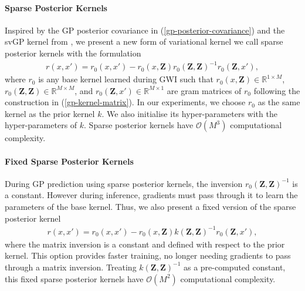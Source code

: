 \documentclass{article}
\numberwithin{equation}{section}
\begin{document}
\paragraph{Sparse Posterior Kernels}
Inspired by the GP posterior covariance in (\ref{gp-posterior-covariance}) and the svGP kernel from \cite{titsias2009variational}, we present a new form of variational kernel we call sparse posterior kernels with the formulation
\begin{align}
    r(x, x') = r_0(x, x') - r_0\left(x, \mathbf{Z}\right) r_0\left(\mathbf{Z}, \mathbf{Z}\right)^{-1} r_0\left(\mathbf{Z}, x'\right),
\end{align}
where $r_0$ is any base kernel learned during GWI such that $r_0\left(x, \mathbf{Z}\right) \in \mathbb{R}^{1 \times M}$, $r_0\left(\mathbf{Z}, \mathbf{Z}\right) \in \mathbb{R}^{M \times M}$, and $r_0\left(\mathbf{Z}, x'\right) \in \mathbb{R}^{M \times 1}$ are gram matrices of $r_0$ following the construction in (\ref{gp-kernel-matrix}).
In our experiments, we choose $r_0$ as the same kernel as the prior kernel $k$. We also initialise its hyper-parameters with the hyper-parameters of $k$.
Sparse posterior kernels have $\mathcal{O}(M^3)$ computational complexity.

\paragraph{Fixed Sparse Posterior Kernels}
During GP prediction using sparse posterior kernels, the inversion $r_0\left(\mathbf{Z}, \mathbf{Z}\right)^{-1}$ is a constant. However during inference, gradients must pass through it to learn the parameters of the base kernel. Thus, we also present a fixed version of the sparse posterior kernel
\begin{align}
    r(x, x') = r_0(x, x') - r_0\left(x, \mathbf{Z}\right) k\left(\mathbf{Z}, \mathbf{Z}\right)^{-1} r_0\left(\mathbf{Z}, x'\right),
\end{align}
where the matrix inversion is a constant and defined with respect to the prior kernel. This option provides faster training, no longer needing gradients to pass through a matrix inversion.
Treating $k\left(\mathbf{Z}, \mathbf{Z}\right)^{-1}$ as a pre-computed constant, this fixed sparse posterior kernels have $\mathcal{O}(M^2)$ computational complexity.
\end{document}
